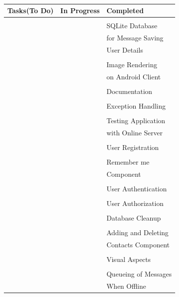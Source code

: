 \documentclass[29pt,a4paper]{moderncv}
\begin{document}
\newpage	
			\\	\begin{tabular}{| p{7cm} | p{7cm} | p{7cm} |}
				\hline
		    		\textbf{Tasks(To Do)} & \textbf{In Progress} & \textbf{Completed} \\ 
   				\hline			
				\\ & & SQLite Database \\ & & for Message Saving \\ & & User Details\\
				
				\\ & & Image Rendering \\ & & on Android Client\\
				
				\\ & & Documentation\\
				
				\\ & & Exception Handling\\
				
				\\ & & Testing Application \\ & & with Online Server\\
				
				\\ & & User Registration\\
				
				\\ & & Remember me \\& & Component\\
				
				\\ & & User Authentication\\
				
				\\ & & User Authorization\\
				
				\\ & & Database Cleanup\\
				
				\\ & & Adding and Deleting\\& & Contacts Component\\
				
				\\ & & Visual Aspects\\
				
				\\ & & Queueing of Messages\\ & & When Offline\\
   				
 			\end{tabular} \\
\end{document}

